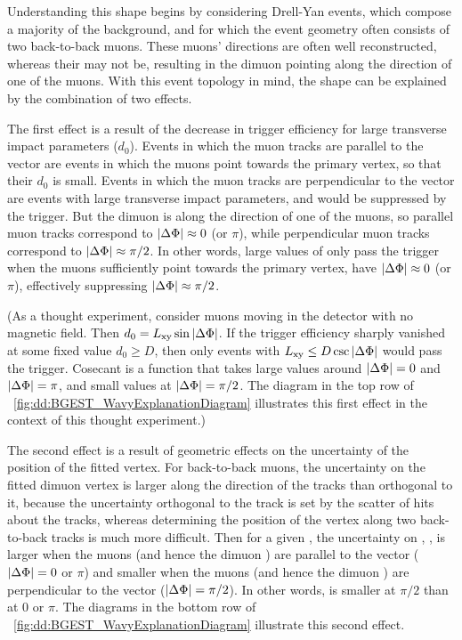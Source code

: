 Understanding this shape begins by considering Drell-Yan events, which compose a majority of the background, and for which the event geometry often consists of two back-to-back muons.
These muons' directions are often well reconstructed, whereas their \pT may not be, resulting in the dimuon \pT pointing along the direction of one of the muons.
With this event topology in mind, the shape can be explained by the combination of two effects.

The first effect is a result of the decrease in trigger efficiency for large transverse impact parameters ($d_{0}$).
Events in which the muon tracks are parallel to the \Lxy vector are events in which the muons point towards the primary vertex, so that their $d_0$ is small.
Events in which the muon tracks are perpendicular to the \Lxy vector are events with large transverse impact parameters, and would be suppressed by the trigger.
But the dimuon \pT is along the direction of one of the muons, so parallel muon tracks correspond to $|\Delta\Phi| \approx 0$ (or $\pi$), while perpendicular muon tracks correspond to $|\Delta\Phi| \approx \pi/2$.
In other words, large values of \Lxy only pass the trigger when the muons sufficiently point towards the primary vertex, \ie have $|\Delta\Phi| \approx 0$ (or $\pi$), effectively suppressing $|\Delta\Phi| \approx \pi/2$.

(As a thought experiment, consider muons moving in the detector with no magnetic field. Then $d_0 = L_{\mathrm{xy}} \sin{\ensuremath{|\Delta\Phi|}}$.
If the trigger efficiency sharply vanished at some fixed value $d_0 \geq D$, then only events with $L_{\mathrm{xy}} \leq D \csc{\ensuremath{|\Delta\Phi|}}$ would pass the trigger.
Cosecant is a function that takes large values around $|\Delta\Phi| = 0$ and $|\Delta\Phi| = \pi$, and small values at $|\Delta\Phi| = \pi/2$.
The diagram in the top row of \Fig~\ref{fig:dd:BGEST_WavyExplanationDiagram} illustrates this first effect in the context of this thought experiment.)

The second effect is a result of geometric effects on the uncertainty of the position of the fitted vertex.
For back-to-back muons, the uncertainty on the fitted dimuon vertex is larger along the direction of the tracks than orthogonal to it, because the uncertainty orthogonal to the track is set by the scatter of hits about the tracks, whereas determining the position of the vertex along two back-to-back tracks is much more difficult.
Then for a given \Lxy, the uncertainty on \Lxy, \LxyErr, is larger when the muons (and hence the dimuon \pT) are parallel to the \Lxy vector (\ie $|\Delta\Phi| = 0$ or $\pi$) and smaller when the muons (and hence the dimuon \pT) are perpendicular to the \Lxy vector (\ie $|\Delta\Phi| = \pi/2$).
In other words, \LxyErr is smaller at $\pi/2$ than at 0 or $\pi$.
The diagrams in the bottom row of \Fig~\ref{fig:dd:BGEST_WavyExplanationDiagram} illustrate this second effect.

